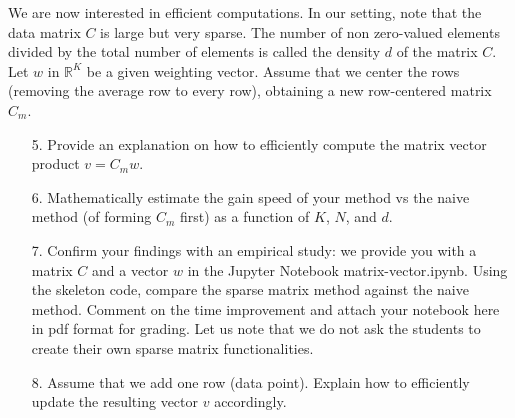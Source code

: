 \documentclass[11pt]{article}
\begin{document}
We are now interested in efficient computations. In our setting, note that the data matrix $C$ is large but very sparse. The number of non zero-valued elements divided by the total number of elements is called the density $d$ of the matrix $C$. Let $w$ in $\mathbb{R}^K$ be a given weighting vector. Assume that we center the rows (removing the average row to every row), obtaining a new row-centered matrix $C_m$. 

\begin{enumerate}
    \item[5.] Provide an explanation on how to efficiently compute the matrix vector product $v = C_m w$.
    
    \item[6.] Mathematically estimate the gain speed of your method vs the naive method (of forming $C_m$ first) as a function of $K$, $N$, and $d$.
    
    \item[7.] Confirm your findings with an empirical study: we provide you with a matrix $C$ and a vector $w$ in the Jupyter Notebook matrix-vector.ipynb. Using the skeleton code, compare the sparse matrix method against the naive method. Comment on the time improvement and attach your notebook here in pdf format for grading. Let us note that we do not ask the students to create their own sparse matrix functionalities.
    
    \item[8.] Assume that we add one row (data point). Explain how to efficiently update the resulting vector $v$ accordingly.
\end{enumerate}

\begin{solution}
\end{solution}
\end{document}
